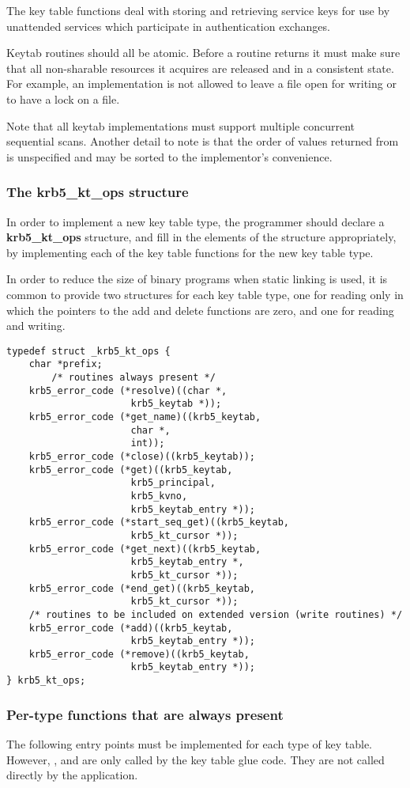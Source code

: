 The key table functions deal with storing and retrieving service keys
for use by unattended services which participate in authentication exchanges.

Keytab routines should all be atomic.  Before a routine returns it
must make sure that all non-sharable resources it acquires are
released and in a consistent state.  For example, an implementation is not
allowed to leave a file open for writing or to have a lock on a file.

Note that all keytab implementations must support multiple concurrent
sequential scans.  Another detail to note is that
the order of values returned from  is
unspecified and may be sorted to the implementor's convenience.

\subsubsection{The krb5_kt_ops structure}
In order to implement a new key table type, the programmer should
declare a {\bf krb5_kt_ops} structure, and fill in the elements of the
structure appropriately, by implementing each of the key table
functions for the new key table type.  

In order to reduce the size of binary programs when static linking is
used, it is common to provide two  structures for
each key table type, one for reading only in which the pointers to the
add and delete functions are zero, and one for reading and writing.

\begin{verbatim}
typedef struct _krb5_kt_ops {
	char *prefix;
        /* routines always present */
	krb5_error_code (*resolve)((char *,
					  krb5_keytab *));
	krb5_error_code (*get_name)((krb5_keytab,
					  char *,
					  int));
	krb5_error_code (*close)((krb5_keytab));
	krb5_error_code (*get)((krb5_keytab,
					  krb5_principal,
					  krb5_kvno,
					  krb5_keytab_entry *));
	krb5_error_code (*start_seq_get)((krb5_keytab,
					  krb5_kt_cursor *));	
	krb5_error_code (*get_next)((krb5_keytab,
					  krb5_keytab_entry *,
					  krb5_kt_cursor *));
	krb5_error_code (*end_get)((krb5_keytab,
					  krb5_kt_cursor *));
	/* routines to be included on extended version (write routines) */
	krb5_error_code (*add)((krb5_keytab,
					  krb5_keytab_entry *));
	krb5_error_code (*remove)((krb5_keytab,
					  krb5_keytab_entry *));
} krb5_kt_ops;
\end{verbatim}

\subsubsection{Per-type functions that are always present}
The following entry points must be implemented for each type of
key table.  However, ,  and
 are only called by the key table glue code.
They are not called directly by the application.

